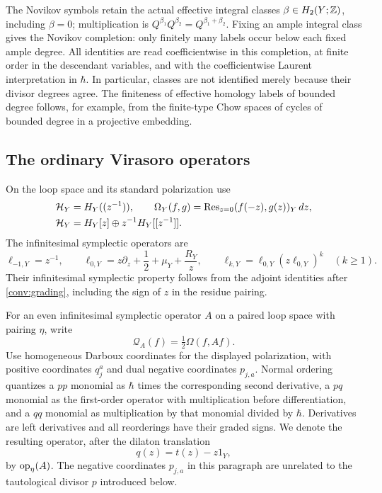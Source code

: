 The Novikov symbols retain the actual effective integral classes
$\beta\in H_2(Y;\mathbb Z)$, including $\beta=0$; multiplication is
$Q^{\beta_1}Q^{\beta_2}=Q^{\beta_1+\beta_2}$.
Fixing an ample integral class gives the Novikov completion: only finitely
many labels occur below each fixed ample degree.  All identities are read
coefficientwise in this completion, at finite order in the descendant
variables, and with the coefficientwise Laurent interpretation in
$\hbar$.  In particular, classes are not identified merely because their
divisor degrees agree.  The finiteness of effective homology labels of
bounded degree follows, for example, from the finite-type Chow spaces of
cycles of bounded degree in a projective embedding.

\subsection{The ordinary Virasoro operators}

On the loop space and its standard polarization use
\begin{equation}
\begin{split}
 \mathcal H_Y&=H_Y((z^{-1})),
 \qquad
 \Omega_Y(f,g)=\operatorname{Res}_{z=0}(f(-z),g(z))_Y\,dz,\\
 \mathcal H_Y&=H_Y[z]\oplus z^{-1}H_Y[[z^{-1}]].
\end{split}
\label{conv:polarization}
\end{equation}
The infinitesimal symplectic operators are
\begin{equation}
 \ell_{-1,Y}=z^{-1},\qquad
 \ell_{0,Y}=z\partial_z+\frac12+\mu_Y+\frac{R_Y}{z},\qquad
 \ell_{k,Y}=\ell_{0,Y}(z\ell_{0,Y})^k\quad(k\geq1).
 \label{conv:ordinary-modes}
\end{equation}
Their infinitesimal symplectic property follows from the adjoint identities
after \eqref{conv:grading}, including the sign of $z$ in the residue
pairing.

For an even infinitesimal symplectic operator $A$ on a paired loop space
with pairing $\eta$, write
\[
 \mathcal Q_A(f)=\tfrac12\Omega(f,Af).
\]
Use homogeneous Darboux coordinates for the displayed polarization, with
positive coordinates $q_j^a$ and dual negative coordinates $p_{j,a}$.
Normal ordering quantizes a $pp$ monomial as $\hbar$ times the
corresponding second derivative, a $pq$ monomial as the first-order
operator with multiplication before differentiation, and a $qq$ monomial
as multiplication by that monomial divided by $\hbar$.
Derivatives are left derivatives and all reorderings have their graded
signs.  We denote the resulting operator, after the dilaton translation
\begin{equation}
                  q(z)=t(z)-z1_Y,
                  \label{conv:dilaton}
\end{equation}
by $\operatorname{op}_\eta(A)$.  The negative coordinates $p_{j,a}$ in this paragraph
are unrelated to the tautological divisor $p$ introduced below.


